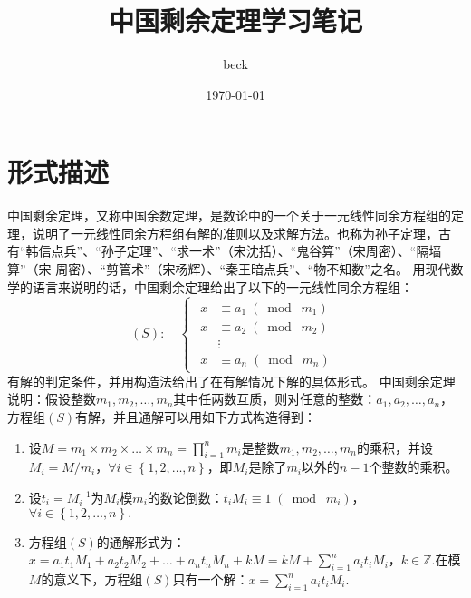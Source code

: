 \documentclass[UTF8]{ctexart}
\title{中国剩余定理学习笔记}
\author{beck}
\date{\today}
\begin{document}
\maketitle
\section{形式描述}
中国剩余定理，又称中国余数定理，是数论中的一个关于一元线性同余方程组的定理，说明了一元线性同余方程组有解的准则以及求解方法。也称为孙子定理，古有“韩信点兵”、“孙子定理”、“求一术”（宋沈括）、“鬼谷算”（宋周密）、“隔墙算”（宋 周密）、“剪管术”（宋杨辉）、“秦王暗点兵”、“物不知数”之名。
用现代数学的语言来说明的话，中国剩余定理给出了以下的一元线性同余方程组：
\[
    (S):\quad
    \begin{cases}
        \begin{aligned}
            x & \equiv a_1 \;(\bmod\;m_1) \\
            x & \equiv a_2 \;(\bmod\;m_2) \\
            & \vdots \\
            x & \equiv a_n \;(\bmod\;m_n)
        \end{aligned}
    \end{cases}
\]
有解的判定条件，并用构造法给出了在有解情况下解的具体形式。
中国剩余定理说明：假设整数$m_1,m_2,\ldots,m_n$其中任两数互质，则对任意的整数：$a_1,a_2,\ldots,a_n$，方程组$(S)$有解，并且通解可以用如下方式构造得到：
\begin{enumerate}[1.]
    \item 设$M = m_1 \times m_2 \times \ldots \times m_n = {\displaystyle \prod_{i=1}^n m_i}$是整数$m_1,m_2,\ldots,m_n$的乘积，并设$M_i=M/m_i$，$\forall i \in \left\{1,2,\ldots,n\right\}$，即$M_i$是除了$m_i$以外的$n - 1$个整数的乘积。
    \item 设$t_i = M_i^{-1}$为$M_i$模$m_i$的数论倒数：$t_iM_i \equiv 1\;(\bmod\;m_i)$，$\forall i \in \left\{1,2,\ldots,n\right\}.$
    \item 方程组$(S)$的通解形式为：$x = a_1t_1M_1 + a_2t_2M_2 + \ldots + a_nt_nM_n + kM = kM + {\displaystyle \sum_{i=1}^n a_it_iM_i}$，$k \in \mathbb{Z}.$在模$M$的意义下，方程组$(S)$只有一个解：$x = {\displaystyle \sum_{i=1}^n a_it_iM_i}.$
\end{enumerate}
\end{document}
